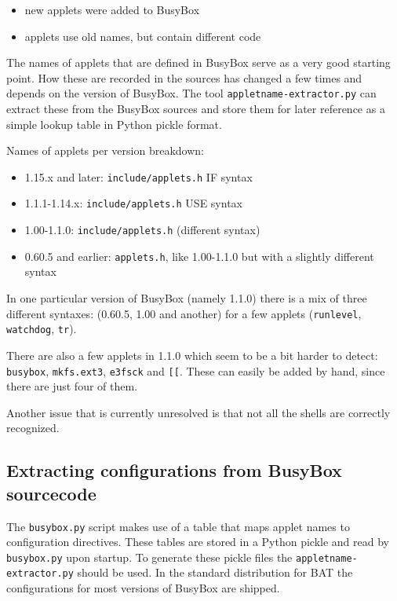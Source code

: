 \documentclass[10pt]{article}
\begin{document}
\begin{itemize}
\item new applets were added to BusyBox
\item applets use old names, but contain different code
\end{itemize}

The names of applets that are defined in BusyBox serve as a very good starting
point. How these are recorded in the sources has changed a few times and
depends on the version of BusyBox. The tool \texttt{appletname-extractor.py}
can extract these from the BusyBox sources and store them for later reference
as a simple lookup table in Python pickle format.

Names of applets per version breakdown:

\begin{itemize}
\item 1.15.x and later: \texttt{include/applets.h} IF syntax
\item 1.1.1-1.14.x: \texttt{include/applets.h} USE syntax
\item 1.00-1.1.0: \texttt{include/applets.h} (different syntax)
\item 0.60.5 and earlier: \texttt{applets.h}, like 1.00-1.1.0 but with a
slightly different syntax
\end{itemize}

In one particular version of BusyBox (namely 1.1.0) there is a mix of three
different syntaxes: (0.60.5, 1.00 and another) for a few applets
(\texttt{runlevel}, \texttt{watchdog}, \texttt{tr}).

There are also a few applets in 1.1.0 which seem to be a bit harder to detect:
\texttt{busybox}, \texttt{mkfs.ext3}, \texttt{e3fsck} and \texttt{[[}. These
can easily be added by hand, since there are just four of them.

Another issue that is currently unresolved is that not all the shells are
correctly recognized.

\subsection{Extracting configurations from BusyBox sourcecode}

The \texttt{busybox.py} script makes use of a table that maps applet names to
configuration directives. These tables are stored in a Python pickle and read
by \texttt{busybox.py} upon startup. To generate these pickle files the
\texttt{appletname-extractor.py} should be used. In the standard distribution
for BAT the configurations for most versions of BusyBox are shipped.
\end{document}
